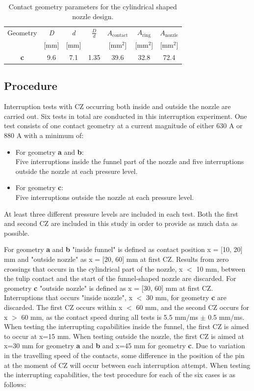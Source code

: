\documentclass[10pt,b5paper,twoside]{article}
\begin{document}
\begin{table}[H]
\center
\caption{Contact geometry parameters for the cylindrical shaped nozzle design.}
 \begin{tabular}{|c|c|c|c|c|c|c|}
\hline 
Geometry & \textit{D} & \textit{d}  & $\frac{D}{d}$ &  $A_\mathrm{{contact}}$ & $A_\mathrm{{ring}}$  & $A_\mathrm{{nozzle}}$ \\
  & [mm] &  [mm] &   &  [mm$^2$] &  [mm$^2$] &   [mm$^2$] \\
\hline 
\textbf{c} & 9.6 & 7.1 & 1.35 & 39.6 & 32.8 & 72.4 \\ 
\hline
\end{tabular} 
\label{tab:contGeoParaC}
\end{table}

\subsection{Procedure}
Interruption tests with CZ occurring both inside and outside the nozzle are carried out. Six tests in total are conducted in this interruption experiment. One test consists of one contact geometry at a current magnitude of either 630 A or 880 A with a minimum of:
\begin{itemize}
\item For geometry \textbf{a} and \textbf{b}: \\
Five interruptions inside the funnel part of the nozzle and five interruptions outside the nozzle at each pressure level.

\item For geometry \textbf{c}: \\
Five interruptions outside the nozzle at each pressure level.

\end{itemize}
At least three different pressure levels are included in each test. Both the first and second CZ are included in this study in order to provide as much data as possible.

For geometry \textbf{a} and \textbf{b} "inside funnel" is defined as contact position x = [10, 20] mm and "outside nozzle" as x = [20, 60] mm at first CZ. Results from zero crossings that occurs in the cylindrical part of the nozzle, x $<$ 10 mm, between the tulip contact and the start of the funnel-shaped nozzle are discarded. For geometry \textbf{c} "outside nozzle" is defined as x = [30, 60] mm at first CZ. Interruptions that occurs "inside nozzle", x $<$ 30 mm, for geometry \textbf{c} are discarded. The first CZ occurs within x $<$ 60 mm, and the second CZ occurs for x $>$ 60 mm, as the contact speed during all tests is 5.5 mm/ms $\pm$ 0.5 mm/ms. When testing the interrupting capabilities inside the funnel, the first CZ is aimed to occur at x=15 mm. When testing outside the nozzle, the first CZ is aimed at x=30 mm for geometry \textbf{a} and \textbf{b} and x=45 mm for geometry \textbf{c}. Due to variation in the travelling speed of the contacts, some difference in the position of the pin at the moment of CZ will occur between each interruption attempt.
\newpage
When testing the interrupting capabilities, the test procedure for each of the six cases is as follows: 
\end{document}
